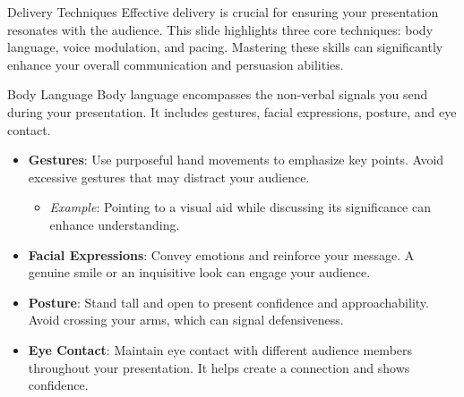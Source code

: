 \documentclass[aspectratio=169]{beamer}
\begin{document}
\begin{frame}[fragile]{Delivery Techniques}
  Effective delivery is crucial for ensuring your presentation resonates with the audience. This slide highlights three core techniques: body language, voice modulation, and pacing. Mastering these skills can significantly enhance your overall communication and persuasion abilities.
\end{frame}

\begin{frame}[fragile]{Body Language}
  Body language encompasses the non-verbal signals you send during your presentation. It includes gestures, facial expressions, posture, and eye contact.

  \begin{itemize}
    \item \textbf{Gestures}: Use purposeful hand movements to emphasize key points. Avoid excessive gestures that may distract your audience.
    \begin{itemize}
      \item \textit{Example}: Pointing to a visual aid while discussing its significance can enhance understanding.
    \end{itemize}
    
    \item \textbf{Facial Expressions}: Convey emotions and reinforce your message. A genuine smile or an inquisitive look can engage your audience.
    
    \item \textbf{Posture}: Stand tall and open to present confidence and approachability. Avoid crossing your arms, which can signal defensiveness.
    
    \item \textbf{Eye Contact}: Maintain eye contact with different audience members throughout your presentation. It helps create a connection and shows confidence.
  \end{itemize}
\end{frame}
\end{document}
